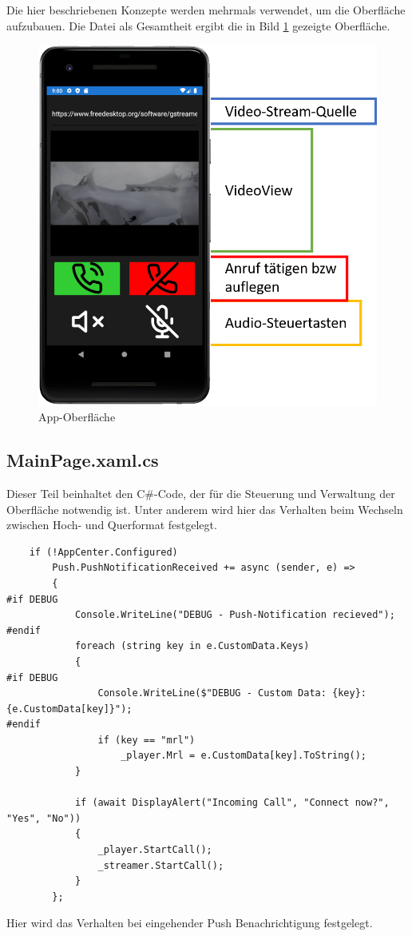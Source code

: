 Die hier beschriebenen Konzepte werden mehrmals verwendet, um die Oberfläche aufzubauen. Die Datei als Gesamtheit ergibt die in Bild \ref{fig:mainpage} gezeigte Oberfläche.
\begin{figure}
    \centering\includegraphics[width=.7\linewidth]{images/xamarin/MainPage.png}
    \caption{App-Oberfläche}
    \label{fig:mainpage}
\end{figure}

\subsection{MainPage.xaml.cs}
\label{ssec:mainpage-xaml-cs}
Dieser Teil beinhaltet den C\#-Code, der für die Steuerung und Verwaltung der Oberfläche notwendig ist.
Unter anderem wird hier das Verhalten beim Wechseln zwischen Hoch- und Querformat festgelegt.
\begin{verbatim}
    if (!AppCenter.Configured)
        Push.PushNotificationReceived += async (sender, e) =>
        {
#if DEBUG
            Console.WriteLine("DEBUG - Push-Notification recieved");
#endif
            foreach (string key in e.CustomData.Keys)
            {
#if DEBUG
                Console.WriteLine($"DEBUG - Custom Data: {key}:{e.CustomData[key]}");
#endif
                if (key == "mrl")
                    _player.Mrl = e.CustomData[key].ToString();
            }

            if (await DisplayAlert("Incoming Call", "Connect now?", "Yes", "No"))
            {
                _player.StartCall();
                _streamer.StartCall();
            }
        };
\end{verbatim}
Hier wird das Verhalten bei eingehender Push Benachrichtigung festgelegt.

